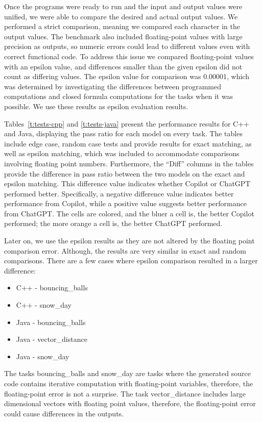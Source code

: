 Once the programs were ready to run and the input and output values were unified, we were able to compare the desired and actual output values.
We performed a strict comparison, meaning we compared each character in the output values.
The benchmark also included floating-point values with large precision as outputs, so numeric errors could lead to different values even with correct functional code.
To address this issue we compared floating-point values with an epsilon value, and differences smaller than the given epsilon did not count as differing values.
The epsilon value for comparison was 0.00001, which was determined by investigating the differences between programmed computations and closed formula computations for the tasks when it was possible.
We use these results as epsilon evaluation results.

Tables~\ref{t:tests-cpp}  and \ref{t:tests-java} present the performance results for C++ and Java, displaying the pass ratio for each model on every task.
The tables include edge case, random case tests and provide results for exact matching, as well as epsilon matching, which was included to accommodate comparisons involving floating point numbers.
Furthermore, the ``Diff'' columns in the tables provide the difference in pass ratio between the two models on the exact and epsilon matching.
This difference value indicates whether Copilot or ChatGPT performed better.
Specifically, a negative difference value indicates better performance from Copilot, while a positive value suggests better performance from ChatGPT.
The cells are colored, and the bluer a cell is, the better Copilot performed;
the more orange a cell is, the better ChatGPT performed.

Later on, we use the epsilon results as they are not altered by the floating point comparison error.
Although, the results are very similar in exact and random comparisons.
There are a few cases where epsilon comparison resulted in a larger difference:

\begin{itemize}
	\item C++ - bouncing\_balls
	\item C++ - snow\_day
	\item Java - bouncing\_balls
	\item Java - vector\_distance
	\item Java - snow\_day
\end{itemize}

The tasks bouncing\_balls and snow\_day are tasks where the generated source code contains iterative computation with floating-point variables, therefore, the floating-point error is not a surprise.
The task vector\_distance includes large dimensional vectors with floating point values, therefore, the floating-point error could cause differences in the outputs.

